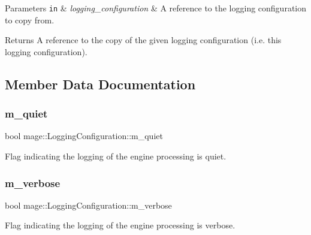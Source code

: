 \begin{DoxyParams}[1]{Parameters}
\mbox{\tt in}  & {\em logging\+\_\+configuration} & A reference to the logging configuration to copy from. \\
\hline
\end{DoxyParams}
\begin{DoxyReturn}{Returns}
A reference to the copy of the given logging configuration (i.\+e. this logging configuration). 
\end{DoxyReturn}


\subsection{Member Data Documentation}
\hypertarget{structmage_1_1_logging_configuration_a38f457d5db84d15e008841ca8653b47c}{}\label{structmage_1_1_logging_configuration_a38f457d5db84d15e008841ca8653b47c} 
\subsubsection{\texorpdfstring{m\+\_\+quiet}{m\_quiet}}
{\footnotesize\ttfamily bool mage\+::\+Logging\+Configuration\+::m\+\_\+quiet\hspace{0.3cm}{\ttfamily [private]}}

Flag indicating the logging of the engine processing is quiet. \hypertarget{structmage_1_1_logging_configuration_a60f052c2bb702d8153188e93f00427ac}{}\label{structmage_1_1_logging_configuration_a60f052c2bb702d8153188e93f00427ac} 
\subsubsection{\texorpdfstring{m\+\_\+verbose}{m\_verbose}}
{\footnotesize\ttfamily bool mage\+::\+Logging\+Configuration\+::m\+\_\+verbose\hspace{0.3cm}{\ttfamily [private]}}

Flag indicating the logging of the engine processing is verbose. 
